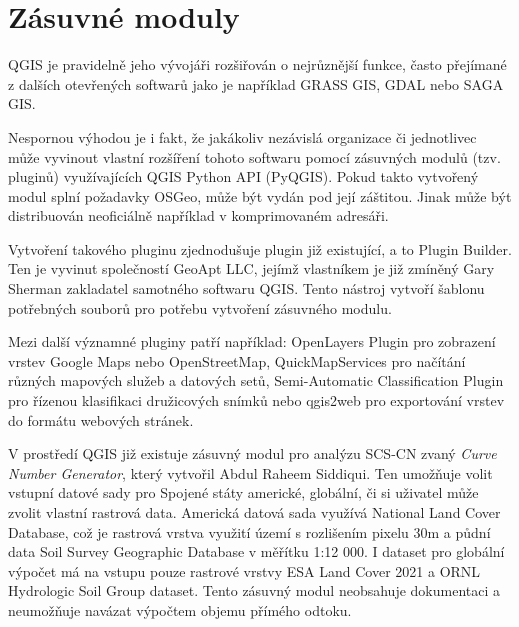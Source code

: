 \documentclass[a4paper,oneside,12pt]{book}
\begin{document}
 \section{Zásuvné moduly} \label{moduly}

\hspace{10mm} QGIS je pravidelně jeho vývojáři rozšiřován o nejrůznější funkce, často přejímané z dalších otevřených softwarů jako je například GRASS GIS, GDAL nebo SAGA GIS.\cite{Baghdadi2018}

\hspace{10mm} Nespornou výhodou je i fakt, že jakákoliv nezávislá organizace či jednotlivec může vyvinout vlastní rozšíření tohoto softwaru pomocí zásuvných modulů (tzv. pluginů) využívajících QGIS Python API (PyQGIS). Pokud takto vytvořený modul splní požadavky OSGeo, může být vydán pod její záštitou. Jinak může být distribuován neoficiálně například v komprimovaném adresáři.

\hspace{10mm} Vytvoření takového pluginu zjednodušuje plugin již existující, a to Plugin Builder. Ten je vyvinut společností GeoApt LLC, jejímž vlastníkem je již zmíněný Gary Sherman zakladatel samotného softwaru QGIS. Tento nástroj vytvoří šablonu potřebných souborů pro potřebu vytvoření zásuvného modulu. \cite{QPwvEntkWdxPk0Lz}

\hspace{10mm} Mezi další významné pluginy patří například: OpenLayers Plugin pro zobrazení vrstev Google Maps nebo OpenStreetMap, QuickMapServices pro načítání různých mapových služeb a datových setů, Semi-Automatic Classification Plugin pro řízenou klasifikaci družicových snímků nebo qgis2web pro exportování vrstev do formátu webových stránek. \cite{QPwvEntkWdxPk0Lz}

\hspace{10mm} V prostředí QGIS již existuje zásuvný modul pro analýzu SCS-CN zvaný \textit{Curve Number Generator}, který vytvořil Abdul Raheem Siddiqui. Ten umožňuje volit vstupní datové sady pro Spojené státy americké, globální, či si uživatel může zvolit vlastní rastrová data. Americká datová sada využívá National Land Cover Database, což je rastrová vrstva využití území s rozlišením pixelu 30m a půdní data Soil Survey Geographic Database v měřítku 1:12 000. I dataset pro globální výpočet má na vstupu pouze rastrové vrstvy ESA Land Cover 2021 a ORNL Hydrologic Soil Group dataset. Tento zásuvný modul neobsahuje dokumentaci a neumožňuje navázat výpočtem objemu přímého odtoku. \cite{siddiqui2020}
\end{document}
